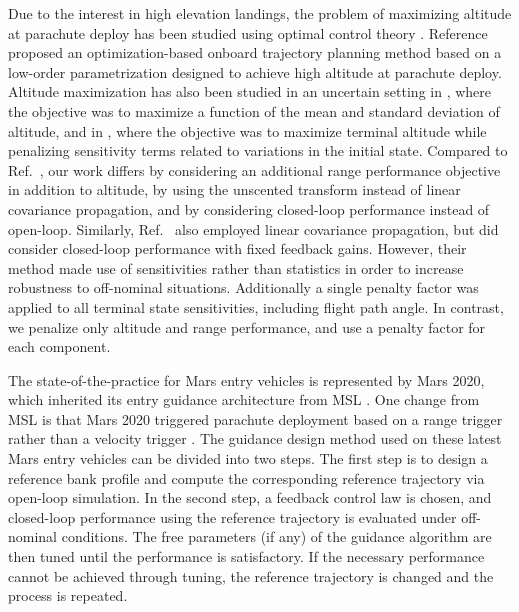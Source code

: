 \documentclass[journal ]{new-aiaa}
\begin{document}
Due to the interest in high elevation landings, the problem of maximizing altitude at parachute deploy has been studied using optimal control theory 
\cite{AltitudeOptimization,AltitudeOptimizationIndirect}. Reference \cite{GuangfeiDissertation} proposed an optimization-based onboard trajectory planning method based on a low-order parametrization designed to achieve high altitude at parachute deploy. 
Altitude maximization has also been studied in an uncertain setting in \cite{AltitudeUnderUncertainty}, where the objective was to maximize a function of the mean and standard deviation of altitude, and in \cite{MarsEntryDesensitized}, where the objective was to maximize terminal altitude while penalizing sensitivity terms related to variations in the initial state. Compared to Ref.~\cite{AltitudeUnderUncertainty}, our work differs by considering an additional range performance objective in addition to altitude, by using the unscented transform instead of linear covariance propagation, and by considering closed-loop performance instead of open-loop. Similarly, Ref.~\cite{MarsEntryDesensitized} also employed linear covariance propagation, but did consider closed-loop performance with fixed feedback gains. However, their method made use of sensitivities\cite{Desensitized} rather than statistics in order to increase robustness to off-nominal situations. Additionally a single penalty factor was applied to all terminal state sensitivities, including flight path angle. In contrast, we penalize only altitude and range performance, and use a penalty factor for each component. 

The state-of-the-practice for Mars entry vehicles is represented by Mars 2020, which inherited its entry guidance architecture from MSL \cite{M2020_EDL}. One change from MSL is that Mars 2020 triggered parachute deployment based on a range trigger rather than a velocity trigger \cite{TriggerComparison2020}.
The guidance design method used on these latest Mars entry vehicles \cite{MSL_EDL2,M2020_EDL} can be divided into two steps. The first step is to design a reference bank profile and compute the corresponding reference trajectory via open-loop simulation. In the second step, a feedback control law is chosen, and closed-loop performance using the reference trajectory is evaluated under off-nominal conditions. The free parameters (if any) of the guidance algorithm are then tuned until the performance is satisfactory. If the necessary performance cannot be achieved through tuning, the reference trajectory is changed and the process is repeated. 
\end{document}

